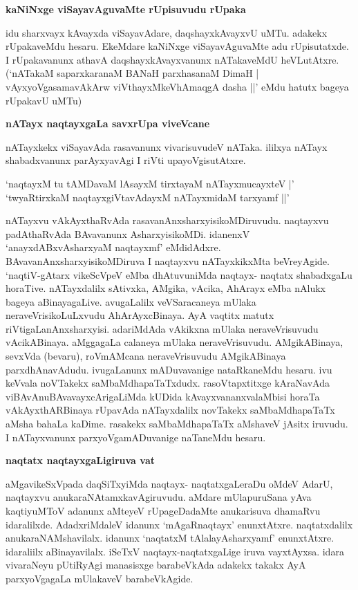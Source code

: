 {\bf kaNiNxge viSayavAguvaMte rUpisuvudu rUpaka}

idu sharxvayx kAvayxda viSayavAdare, daqshayxkAvayxvU uMTu. adakekx rUpakaveMdu hesaru. EkeMdare kaNiNxge viSayavAguvaMte adu rUpisutatxde. I rUpakavanunx athavA daqshayxkAvayxvanunx nATakaveMdU heVLutAtxre. (`nATakaM saparxkaranaM BANaH parxhasanaM DimaH | vAyxyoVgasamavAkArw viVthayxMkeVhAmaqgA dasha ||' eMdu hatutx bageya rUpakavU uMTu)

{\bf nATayx naqtayxgaLa savxrUpa viveVcane}

nATayxkekx viSayavAda rasavanunx vivarisuvudeV nATaka. ililxya nATayx shabadxvanunx parAyxyavAgi I riVti upayoVgisutAtxre.

\begin{shloka}
`naqtayxM tu tAMDavaM lAsayxM tirxtayaM nATayxmucayxteV |'\\
`twyaRtirxkaM naqtayxgiVtavAdayxM nATayxmidaM tarxyamf ||'
\end{shloka}

nATayxvu vAkAyxthaRvAda rasavanAnxsharxyisikoMDiruvudu. naqtayxvu padAthaRvAda BAvavanunx AsharxyisikoMDi. idanenxV `anayxdABxvAsharxyaM naqtayxmf' eMdidAdxre. BAvavanAnxsharxyisikoMDiruva I naqtayxvu nATayxkikxMta beVreyAgide. `naqtiV-gAtarx vikeScVpeV eMba dhAtuvuniMda naqtayx- naqtatx shabadxgaLu horaTive. nATayxdalilx sAtivxka, AMgika, vAcika, AhArayx eMba nAlukx bageya aBinayagaLive. avugaLalilx veVSaracaneya mUlaka neraveVrisikoLuLxvudu AhArAyxcBinaya. AyA vaqtitx matutx riVtigaLanAnxsharxyisi. adariMdAda vAkikxna mUlaka neraveVrisuvudu vAcikABinaya. aMggagaLa calaneya mUlaka neraveVrisuvudu. AMgikABinaya, sevxVda (bevaru), roVmAMcana neraveVrisuvudu AMgikABinaya parxdhAnavAdudu. ivugaLanunx mADuvavanige nataRkaneMdu hesaru. ivu keVvala noVTakekx saMbaMdhapaTaTxdudx. rasoVtapxtitxge kAraNavAda viBAvAnuBAvavayxcArigaLiMda kUDida kAvayxvananxvalaMbisi horaTa vAkAyxthARBinaya rUpavAda nATayxdalilx novTakekx saMbaMdhapaTaTx aMsha bahaLa kaDime. rasakekx saMbaMdhapaTaTx aMshaveV jAsitx iruvudu. I nATayxvanunx parxyoVgamADuvanige naTaneMdu hesaru.

{\bf naqtatx naqtayxgaLigiruva vat}

aMgavikeSxVpada daqSiTxyiMda naqtayx- naqtatxgaLeraDu oMdeV AdarU, naqtayxvu anukaraNAtamxkavAgiruvudu. aMdare mUlapuruSana yAva kaqtiyuMToV adanunx aMteyeV rUpageDadaMte anukarisuva dhamaRvu idaralilxde. AdadxriMdaleV idanunx `mAgaRnaqtayx' enunxtAtxre. naqtatxdalilx anukaraNAMshavilalx. idanunx `naqtatxM tAlalayAsharxyamf' enunxtAtxre. idaraliilx aBinayavilalx. iSeTxV naqtayx-naqtatxgaLige iruva vayxtAyxsa. idara vivaraNeyu pUtiRyAgi manasisxge barabeVkAda adakekx takakx AyA parxyoVgagaLa mUlakaveV barabeVkAgide.

